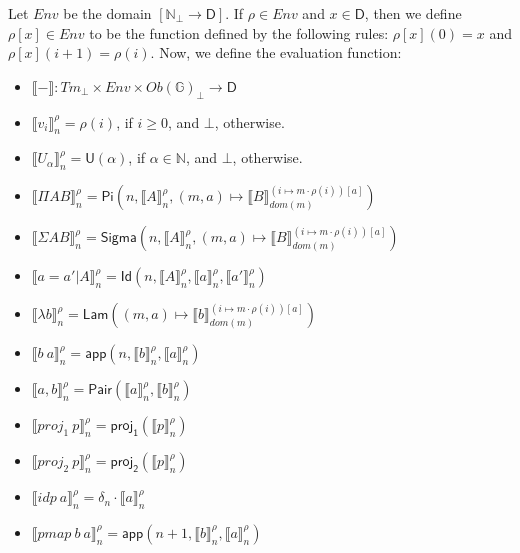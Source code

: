\documentclass{amsart}
\theoremstyle{definition}
\theoremstyle{remark}
\newcommand{\D}{\mathsf{D}}
\newcommand{\bbG}{\mathbb{G}}
\newcommand{\nats}{\mathbb{N}}
\numberwithin{table}{section}
\begin{document}
Let $Env$ be the domain $[\nats_\bot \to \D]$.
If $\rho \in Env$ and $x \in \D$, then we define $\rho[x] \in Env$ to be the function defined by the following rules: $\rho[x](0) = x$ and $\rho[x](i+1) = \rho(i)$.
Now, we define the evaluation function:
\begin{itemize}
\item[] $\llbracket - \rrbracket : Tm_\bot \times Env \times Ob(\bbG)_\bot \to \D$
\item[] $\llbracket v_i \rrbracket^\rho_n = \rho(i)$, if $i \geq 0$, and $\bot$, otherwise.
\item[] $\llbracket U_\alpha \rrbracket^\rho_n = \mathsf{U}(\alpha)$, if $\alpha \in \nats$, and $\bot$, otherwise.
\item[] $\llbracket \Pi A B \rrbracket^\rho_n = \mathsf{Pi}(n, \llbracket A \rrbracket^\rho_n, (m, a) \mapsto \llbracket B \rrbracket^{(i \mapsto m \cdot \rho(i))[a]}_{dom(m)})$
\item[] $\llbracket \Sigma A B \rrbracket^\rho_n = \mathsf{Sigma}(n, \llbracket A \rrbracket^\rho_n, (m, a) \mapsto \llbracket B \rrbracket^{(i \mapsto m \cdot \rho(i))[a]}_{dom(m)})$
\item[] $\llbracket a = a' | A \rrbracket^\rho_n = \mathsf{Id}(n, \llbracket A \rrbracket^\rho_n, \llbracket a \rrbracket^\rho_n, \llbracket a' \rrbracket^\rho_n)$
\item[] $\llbracket \lambda b \rrbracket^\rho_n = \mathsf{Lam}((m, a) \mapsto \llbracket b \rrbracket^{(i \mapsto m \cdot \rho(i))[a]}_{dom(m)})$
\item[] $\llbracket b\ a \rrbracket^\rho_n = \mathsf{app}(n, \llbracket b \rrbracket^\rho_n, \llbracket a \rrbracket^\rho_n)$
\item[] $\llbracket a, b \rrbracket^\rho_n = \mathsf{Pair}(\llbracket a \rrbracket^\rho_n, \llbracket b \rrbracket^\rho_n)$
\item[] $\llbracket proj_1\ p \rrbracket^\rho_n = \mathsf{proj_1}(\llbracket p \rrbracket^\rho_n)$
\item[] $\llbracket proj_2\ p \rrbracket^\rho_n = \mathsf{proj_2}(\llbracket p \rrbracket^\rho_n)$
\item[] $\llbracket idp\ a \rrbracket^\rho_n = \delta_n \cdot \llbracket a \rrbracket^\rho_n$
\item[] $\llbracket pmap\ b\ a \rrbracket^\rho_n = \mathsf{app}(n + 1, \llbracket b \rrbracket^\rho_n, \llbracket a \rrbracket^\rho_n)$
\end{itemize}
\end{document}
